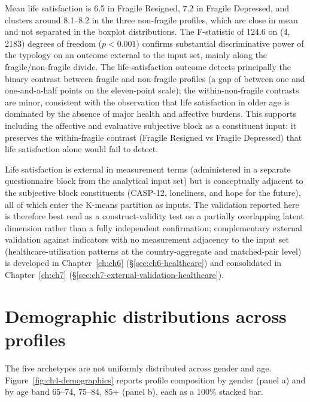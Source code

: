 Mean life satisfaction is 6.5 in Fragile Resigned, 7.2 in Fragile Depressed, and clusters around 8.1--8.2 in the three non-fragile profiles, which are close in mean and not separated in the boxplot distributions. The F-statistic of 124.6 on (4, 2183) degrees of freedom ($p < 0.001$) confirms substantial discriminative power of the typology on an outcome external to the input set, mainly along the fragile/non-fragile divide. The life-satisfaction outcome detects principally the binary contrast between fragile and non-fragile profiles (a gap of between one and one-and-a-half points on the eleven-point scale); the within-non-fragile contrasts are minor, consistent with the observation that life satisfaction in older age is dominated by the absence of major health and affective burdens. This supports including the affective and evaluative subjective block as a constituent input: it preserves the within-fragile contrast (Fragile Resigned vs Fragile Depressed) that life satisfaction alone would fail to detect.

Life satisfaction is external in measurement terms (administered in a separate questionnaire block from the analytical input set) but is conceptually adjacent to the subjective block constituents (CASP-12, loneliness, and hope for the future), all of which enter the K-means partition as inputs. The validation reported here is therefore best read as a construct-validity test on a partially overlapping latent dimension rather than a fully independent confirmation; complementary external validation against indicators with no measurement adjacency to the input set (healthcare-utilisation patterns at the country-aggregate and matched-pair level) is developed in Chapter~\ref{ch:ch6} (\S\ref{sec:ch6-healthcare}) and consolidated in Chapter~\ref{ch:ch7} (\S\ref{sec:ch7-external-validation-healthcare}).

\section{Demographic distributions across profiles}
\label{sec:ch4-demographics}

The five archetypes are not uniformly distributed across gender and age. Figure~\ref{fig:ch4-demographics} reports profile composition by gender (panel a) and by age band 65--74, 75--84, 85+ (panel b), each as a 100\% stacked bar.

